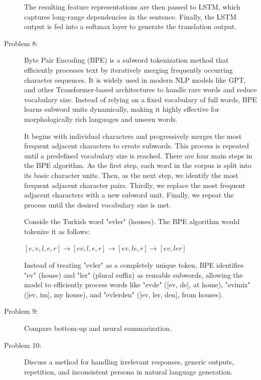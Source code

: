 \documentclass[10pt]{article}
\begin{document}
\begin{description}
The resulting feature representations are then passed to LSTM, which captures long-range dependencies in the sentence.
Finally, the LSTM output is fed into a softmax layer to generate the translation output.

\pagebreak

\item[Problem 8:]  \hfill %

Byte Pair Encoding (BPE) is a subword tokenization method that efficiently processes text by iteratively merging frequently occurring character sequences. 
It is widely used in modern NLP models like GPT, and other Transformer-based architectures to handle rare words and reduce vocabulary size. 
Instead of relying on a fixed vocabulary of full words, BPE learns subword units dynamically, making it highly effective for morphologically rich languages and unseen words.

It begins with individual characters and progressively merges the most frequent adjacent characters to create subwords. 
This process is repeated until a predefined vocabulary size is reached. There are four main steps in the BPE algorithm.
As the first step, each word in the corpus is split into its basic character units. Then, as the next step, we identify the most frequent adjacent character pairs.
Thirdly, we replace the most frequent adjacent characters with a new subword unit.
Finally, we repeat the process until the desired vocabulary size is met.

Conside the Turkish word "evler" (houses). The BPE algorithm would tokenize it as follows:

\begin{center}
    $[e, v, l, e, r] \rightarrow [ev, l, e, r] \rightarrow [ev, le, r] \rightarrow [ev, ler]$
\end{center}

Instead of treating "evler" as a completely unique token, BPE identifies "ev" (house) and "ler" (plural suffix) as reusable subwords, 
allowing the model to efficiently process words like "evde" ([ev, de], at home), "evimiz" ([ev, im], my house), and "evlerden" ([ev, ler, den], from houses).

\pagebreak

\item[Problem 9:]  Compare bottom-up and neural summarization.

\pagebreak

\item[Problem 10:]  Discuss a method for handling irrelevant responses, generic outputs, repetition, and inconsistent persona in natural language generation.


\end{description}
\end{document}
